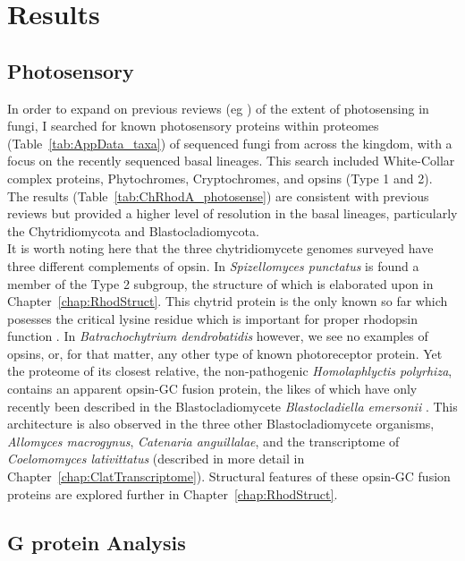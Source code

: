 \section{Results}
\subsection*{Photosensory}
In order to expand on previous reviews (eg \cite{Idnurm2010}) of the extent of photosensing in fungi, I searched for known photosensory proteins within proteomes (Table~\ref{tab:AppData_taxa}) of sequenced fungi from across the kingdom, with a focus on the recently sequenced basal lineages. This search included White-Collar complex proteins, Phytochromes, Cryptochromes, and opsins (Type 1 and 2). The results (Table~\ref{tab:ChRhodA_photosense}) are consistent with previous reviews but provided a higher level of resolution in the basal lineages, particularly the Chytridiomycota and Blastocladiomycota.\\
\indent It is worth noting here that the three chytridiomycete genomes surveyed have three different complements of opsin. In \textit{Spizellomyces punctatus} is found a member of the Type 2 subgroup, the structure of which is elaborated upon in Chapter~\ref{chap:RhodStruct}. This chytrid protein is the only known so far which posesses the critical lysine residue which is important for proper rhodopsin function \cite{Smith2010}. In \textit{Batrachochytrium dendrobatidis} however, we see no examples of opsins, or, for that matter, any other type of known photoreceptor protein. Yet the proteome of its closest relative, the non-pathogenic \textit{Homolaphlyctis polyrhiza}, contains an apparent opsin-GC fusion protein, the likes of which have only recently been described in the Blastocladiomycete \textit{Blastocladiella emersonii} \cite{Avelar2014}. This architecture is also observed in the three other Blastocladiomycete organisms, \textit{Allomyces macrogynus}, \textit{Catenaria anguillalae}, and the transcriptome of \textit{Coelomomyces lativittatus} (described in more detail in Chapter~\ref{chap:ClatTranscriptome}). Structural features of these opsin-GC fusion proteins are explored further in Chapter~\ref{chap:RhodStruct}.\\
\subsection*{G protein Analysis}
